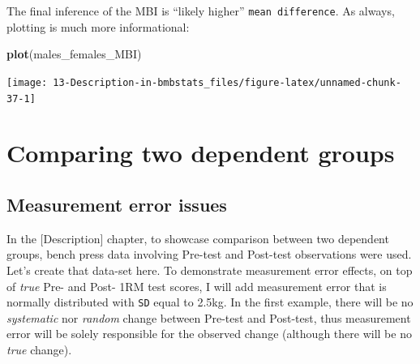 \documentclass[
]{book}
\newenvironment{Shaded}{\begin{snugshade}}{\end{snugshade}}
\newcommand{\KeywordTok}[1]{\textcolor[rgb]{0.13,0.29,0.53}{\textbf{#1}}}
\newcommand{\NormalTok}[1]{#1}
\begin{document}
The final inference of the MBI is ``likely higher'' \texttt{mean\ difference}. As always, plotting is much more informational:

\begin{Shaded}
\begin{Highlighting}[]
\KeywordTok{plot}\NormalTok{(males\_females\_MBI)}
\end{Highlighting}
\end{Shaded}

\begin{center}\texttt{[image: 13-Description-in-bmbstats\_files/figure-latex/unnamed-chunk-37-1]} \end{center}

\hypertarget{comparing-two-dependent-groups}{%
\section{Comparing two dependent groups}\label{comparing-two-dependent-groups}}

\hypertarget{measurement-error-issues}{%
\subsection{Measurement error issues}\label{measurement-error-issues}}

In the {[}Description{]} chapter, to showcase comparison between two dependent groups, bench press data involving Pre-test and Post-test observations were used. Let's create that data-set here. To demonstrate measurement error effects, on top of \emph{true} Pre- and Post- 1RM test scores, I will add measurement error that is normally distributed with \texttt{SD} equal to 2.5kg. In the first example, there will be no \emph{systematic} nor \emph{random} change between Pre-test and Post-test, thus measurement error will be solely responsible for the observed change (although there will be no \emph{true} change).
\end{document}
